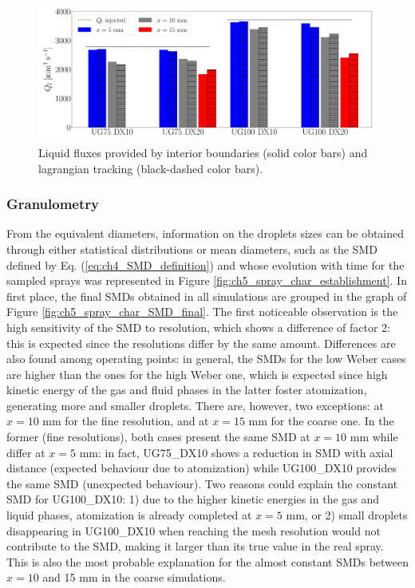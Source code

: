 \begin{figure}[ht]
	\centering
   \includegraphics[scale=0.20]{./part2_developments/figures_ch5_resolved_JICF/SPRAY_characterization/establishment_and_fluxes/fluxes_SLI_vs_IBs}
   \caption{Liquid fluxes provided by interior boundaries (solid color bars) and lagrangian tracking (black-dashed color bars).}
   \label{fig:fluxes_bargraph_IBs_vs_LGS}
\end{figure}


\subsubsection*{Granulometry}
\label{ch5:subsubsec_spray_char_granulo}

From the equivalent diameters, information on the droplets sizes can be obtained through either statistical distributions or mean diameters, such as the SMD defined by Eq. (\ref{eq:ch4_SMD_definition}) and whose evolution with time for the sampled sprays was represented in Figure \ref{fig:ch5_spray_char_establishment}. In first place, the final SMDs obtained in all simulations are grouped in the graph of Figure \ref{fig:ch5_spray_char_SMD_final}. The first noticeable observation is the high sensitivity of the SMD to resolution, which shows a difference of factor 2: this is expected since the resolutions differ by the same amount. Differences are also found among operating points: in general, the SMDs for the low Weber cases are higher than the ones for the high Weber one, which is expected since high kinetic energy of the gas and fluid phases in the latter foster atomization, generating more and smaller droplets. There are, however, two exceptions: at $x = 10$ mm for the fine resolution, and at $x = 15$ mm for the coarse one. In the former (fine resolutions), both cases present the same SMD at $x = 10$ mm while differ at $x = 5$ mm: in fact, UG75\_DX10 shows a reduction in SMD with axial distance (expected behaviour due to atomization) while UG100\_DX10 provides the same SMD (unexpected behaviour). Two reasons could explain the constant SMD for UG100\_DX10: 1) due to the higher kinetic energies in the gas and liquid phases, atomization is already completed at $x = 5$ mm, or 2) small droplets disappearing in UG100\_DX10 when reaching the mesh resolution would not contribute to the SMD, making it larger than its true value in the real spray. This is also the most probable explanation for the almost constant SMDs between $x = 10$ and 15 mm in the coarse simulations.

